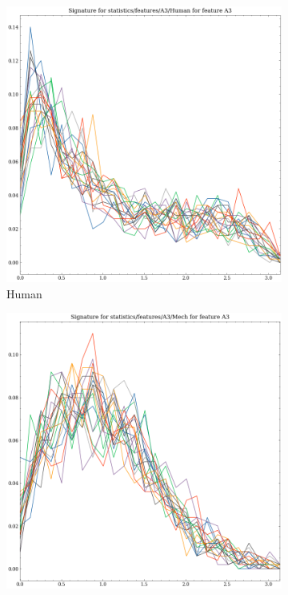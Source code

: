 \begin{figure}[ht]
    \begin{subfigure}[b]{0.23\textwidth}
        \includegraphics[width=\textwidth]{assets/feature_extraction/A3/Human.png}
        \caption{Human}
        \label{fig:features-statistics-A3-q}    
    \end{subfigure}
    \hfill
    \begin{subfigure}[b]{0.23\textwidth}
        \includegraphics[width=\textwidth]{assets/feature_extraction/A3/Mech.png}

\end{subfigure}
\end{figure}
